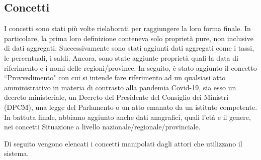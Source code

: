 \subsection{Concetti}
\label{ss:concetti}
I concetti sono stati più volte rielaborati per raggiungere la loro forma finale.
In particolare, la prima loro definizione conteneva solo proprietà pure, non inclusive di dati aggregati. Successivamente sono stati aggiunti dati aggregati come i tassi, le percentuali, i saldi.
Ancora, sono state aggiunte proprietà quali la data di riferimento e i nomi delle regioni/province.
In seguito, è stato aggiunto il concetto ``Provvedimento" con cui si intende fare riferimento ad un qualsiasi atto amministrativo in materia di contrasto alla pandemia Covid-19, sia esso un decreto ministeriale, un Decreto del Presidente del Consiglio dei Ministri (DPCM), una legge del Parlamento o un atto emanato da un istituto competente.
In battuta finale, abbiamo aggiunto anche dati anagrafici, quali l'età e il genere, nei concetti Situazione a livello nazionale/regionale/provinciale.

Di seguito vengono elencati i concetti manipolati dagli attori che utilizzano il sistema.


